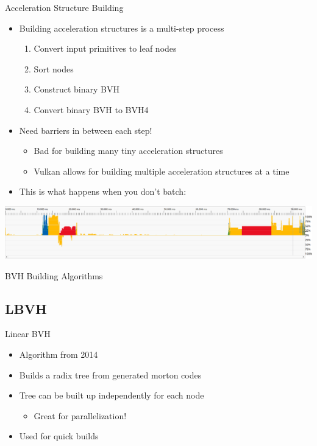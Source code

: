 \documentclass[aspectratio=169,t]{beamer}
\begin{document}
\begin{slide}{Acceleration Structure Building}
 \begin{itemize}
  \item Building acceleration structures is a multi-step process
  \begin{enumerate}
   \item Convert input primitives to leaf nodes
   \item Sort nodes
   \item Construct binary BVH
   \item Convert binary BVH to BVH4
  \end{enumerate}
  \item Need barriers in between each step!
  \begin{itemize}
   \item Bad for building many tiny acceleration structures
   \item Vulkan allows for building multiple acceleration structures at a time
  \end{itemize}
  \pause
  \item This is what happens when you don't batch:
 \end{itemize}
 \includegraphics[width=\textwidth]{graphics/mostperformantasbuild.png}
\end{slide}

\chapterIntroConfig
\begin{slide}{BVH Building Algorithms}
\end{slide}

\subsection{LBVH}

\begin{slide}{Linear BVH}
  \begin{itemize}
   \item Algorithm from 2014
   \item Builds a radix tree from generated morton codes
   \item Tree can be built up independently for each node
   \begin{itemize}
    \item Great for parallelization!
   \end{itemize}
   \item Used for quick builds
  \end{itemize}
\end{slide}
\end{document}
